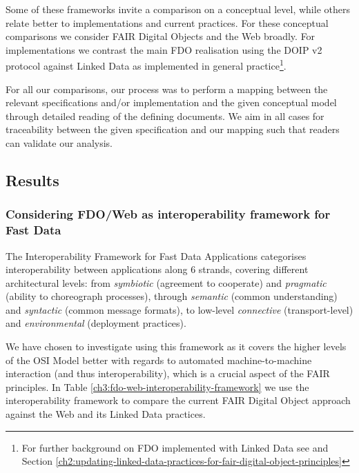 Some of these frameworks invite a comparison on a conceptual level, while others relate better to implementations and current practices. For these conceptual comparisons we consider FAIR Digital Objects and the Web broadly. For implementations we contrast the main FDO realisation using the \acrshort{DOIP} v2 protocol \cite{DONA 2018} against Linked Data as implemented in general practice\footnote{For further background on FDO implemented with Linked Data see \cite{Bonino 2020} and Section \vref{ch2:updating-linked-data-practices-for-fair-digital-object-principles}}.

For all our comparisons, our process was to perform a mapping between the relevant specifications and/or implementation and the given conceptual model through detailed reading of the defining documents. We aim in all cases for traceability between the given specification and our mapping such that readers can validate our analysis.

\subsection{Results}\label{ch3:results}

\subsubsection{Considering FDO/Web as interoperability framework for Fast Data}\label{ch3:interoperability-compare}


The Interoperability Framework for Fast Data Applications \cite{Delgado 2016} categorises interoperability between applications along 6 strands, covering different architectural levels: from \emph{symbiotic} (agreement to cooperate) and \emph{pragmatic} (ability to choreograph processes), through \emph{semantic} (common understanding) and \emph{syntactic} (common message formats), to low-level \emph{connective} (transport-level) and \emph{environmental} (deployment practices).

We have chosen to investigate using this framework as it covers the higher levels of the OSI Model \cite{Stallings 1990} better with regards to automated machine-to-machine interaction (and thus interoperability), which is a crucial aspect of the FAIR principles. In Table \ref{ch3:fdo-web-interoperability-framework} we use the interoperability framework to compare the current FAIR Digital Object approach against the Web and its Linked Data practices.


